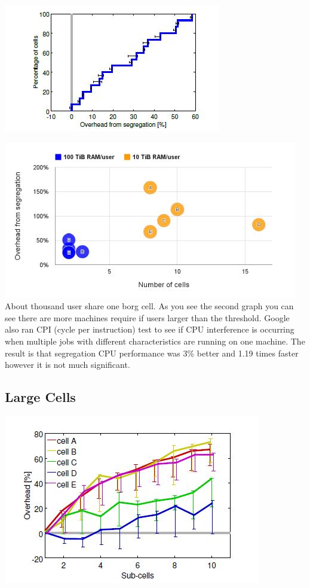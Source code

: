 \documentclass[runningheads,a4paper]{llncs}
\begin{document}
\includegraphics[scale=1.4, left]{cellsharing1}

\includegraphics{cellsharing2}
About thousand user share one borg cell. As you see the second graph you can see there are more machines require if users larger than the threshold.
Google also ran CPI (cycle per instruction) test to see if CPU interference is occurring when multiple jobs with different characteristics are running on one machine.
The result is that segregation CPU performance was 3\% better and 1.19 times faster however it is not much significant.

\subsection{Large Cells}

\includegraphics{LargeCell1}
\end{document}
